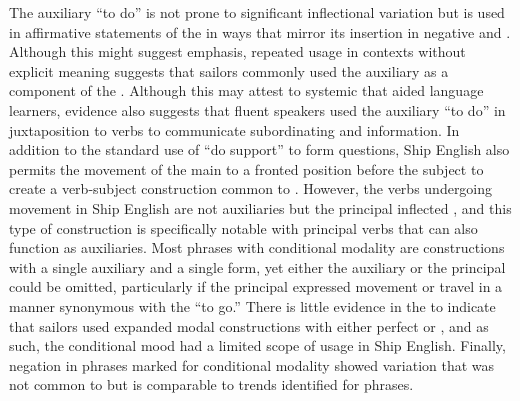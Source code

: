 The auxiliary “to do” is not prone to significant inflectional variation but is used in affirmative statements of the  in ways that mirror its insertion in negative and . Although this might suggest emphasis, repeated usage in contexts without explicit  meaning suggests that sailors commonly used the auxiliary as a component of the . Although this may attest to systemic  that aided language learners, evidence also suggests that fluent speakers used the auxiliary “to do” in juxtaposition to  verbs to communicate subordinating and  information. In addition to the standard use of “do support” to form questions, Ship English also permits the movement of the main  to a fronted position before the subject to create a verb-subject construction common to . However, the verbs undergoing movement in Ship English are not auxiliaries but the principal inflected , and this type of construction is specifically notable with principal verbs that can also function as auxiliaries. Most  phrases with conditional modality are constructions with a single auxiliary and a single  form, yet either the auxiliary or the principal  could be omitted, particularly if the principal  expressed movement or travel in a manner synonymous with the  “to go.” There is little evidence in the  to indicate that sailors used expanded modal constructions with either perfect or , and as such, the conditional mood had a limited scope of usage in Ship English. Finally, negation in  phrases marked for conditional modality showed variation that was not common to  but is comparable to trends identified for  phrases. 

